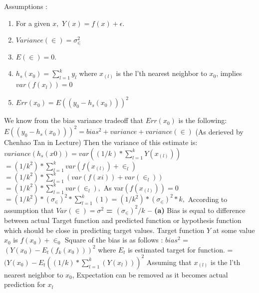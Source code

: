 \documentclass[11pt]{article}
\begin{document}
Assumptions :\newline
\begin{enumerate}
\item For a given $x,$  $Y(x)=f(x)+ϵ $. 
\item  $Variance(\in) = \sigma_{\in}^2$
\item $E(\in) = 0.$
\item $h_s(x_0) = \sum_{l=1}^{k}y_l $  where $x_{(l)}$ is the l'th nearest neighbor to $x_0$, implies $var(f(x_{l})) = 0$
\item $Err(x_0) = E((y_0 - h_s(x_0)))^2$\newline
\end{enumerate}
 We know from the bias variance tradeoff that $Err(x_0) $ is the following: \newline
$E((y_0 - h_s(x_0)))^2 = bias^2 + variance +  variance(\in) $\newline
 (As derieved by Chenhao Tan in Lecture)\newline
\newline Then the variance of this estimate is:
$variance(h_s(x0)) = var((1/k)*\sum_{l=1}^{k}Y(x_{(l)}))$\newline
$=(1/k^2)*\sum_{l=1}^{k}var(f(x_{(l)})+\in_l)$\newline
$=(1/k^2)*\sum_{l=1}^{k}(var(f(xi))+var(\in_l))$\newline
$=(1/k^2)*\sum_{l=1}^{k}var(\in_l),$ As var$(f(x_{(l)}))=0$\newline 
$=(1/k^2)*(\sigma_\in)^2*\sum_{l=1}^{k}(1)=(1/k^2)*(\sigma_\in)^2 * k ,$ According to assumption that $Var(\in) = \sigma^2$\newline
\textbf{= $(\sigma_\in)^2/k $   -- (a) }\newline 
\newline Bias is equal to difference between actual Target function and predicted  function or hypothesis function which should be close in predicting target values. \newline Target function $Y$ at some value $x_0$ is $f(x_0) + \in_0$\newline
			Square of the bias is as follows : \newline
$bias^2$ = $(Y(x_0)- E_t(f_k(x_0)))^2$ where $E_t$ is estimated target for function.\newline 
=$(Y(x_0)- E_t((1/k)*\sum_{l=1}^{k}(Y(x_l)))^2$\newline
Assuming that $x_{(l)}$ is the l'th nearest neighbor to $x_0$, Expectation can be removed as it becomes actual prediction for $x_l$\newline
\end{document}
